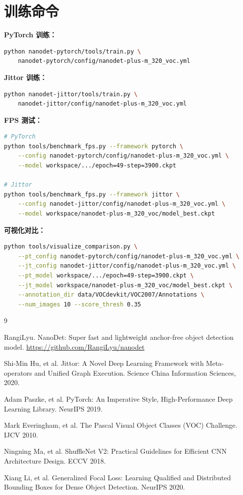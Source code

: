 \documentclass[12pt,a4paper]{article}
\begin{document}
\section{训练命令}

\textbf{PyTorch 训练：}
\begin{lstlisting}[language=bash]
python nanodet-pytorch/tools/train.py \
    nanodet-pytorch/config/nanodet-plus-m_320_voc.yml
\end{lstlisting}

\textbf{Jittor 训练：}
\begin{lstlisting}[language=bash]
python nanodet-jittor/tools/train.py \
    nanodet-jittor/config/nanodet-plus-m_320_voc.yml
\end{lstlisting}

\textbf{FPS 测试：}
\begin{lstlisting}[language=bash]
# PyTorch
python tools/benchmark_fps.py --framework pytorch \
    --config nanodet-pytorch/config/nanodet-plus-m_320_voc.yml \
    --model workspace/.../epoch=49-step=3900.ckpt

# Jittor
python tools/benchmark_fps.py --framework jittor \
    --config nanodet-jittor/config/nanodet-plus-m_320_voc.yml \
    --model workspace/nanodet-plus-m_320_voc/model_best.ckpt
\end{lstlisting}

\textbf{可视化对比：}
\begin{lstlisting}[language=bash]
python tools/visualize_comparison.py \
    --pt_config nanodet-pytorch/config/nanodet-plus-m_320_voc.yml \
    --jt_config nanodet-jittor/config/nanodet-plus-m_320_voc.yml \
    --pt_model workspace/.../epoch=49-step=3900.ckpt \
    --jt_model workspace/nanodet-plus-m_320_voc/model_best.ckpt \
    --annotation_dir data/VOCdevkit/VOC2007/Annotations \
    --num_images 10 --score_thresh 0.35
\end{lstlisting}

\begin{thebibliography}{9}

\bibitem{nanodet}
RangiLyu. NanoDet: Super fast and lightweight anchor-free object detection model. \url{https://github.com/RangiLyu/nanodet}

\bibitem{jittor}
Shi-Min Hu, et al. Jittor: A Novel Deep Learning Framework with Meta-operators and Unified Graph Execution. Science China Information Sciences, 2020.

Adam Paszke, et al. PyTorch: An Imperative Style, High-Performance Deep Learning Library. NeurIPS 2019.

\bibitem{voc}
Mark Everingham, et al. The Pascal Visual Object Classes (VOC) Challenge. IJCV 2010.

Ningning Ma, et al. ShuffleNet V2: Practical Guidelines for Efficient CNN Architecture Design. ECCV 2018.

\bibitem{gfl}
Xiang Li, et al. Generalized Focal Loss: Learning Qualified and Distributed Bounding Boxes for Dense Object Detection. NeurIPS 2020.

\end{thebibliography}
\end{document}

